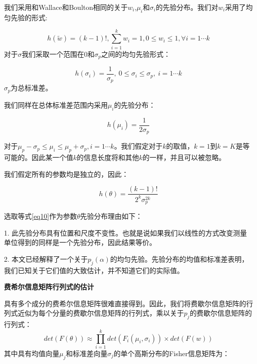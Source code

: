 \documentclass[a4paper,12pt,openany,oneside,utf-8]{ctexbook}
\begin{document}
	我们采用和Wallace和Boulton\cite{ref29}相同的关于$w_i$,$\mu_i$和$\sigma_i$的先验分布。我们对$w_i$采用了均匀先验的形式:
	
    \begin{equation}
        h(\tilde{w})=(k-1)!,\sum_{i=1}^k w_i=1,0\leq w_i\leq 1,\forall i=1\cdots k
    \end{equation}
	对于$\sigma$我们采取一个范围在0和$\sigma_p$之间的均匀先验形式：
	
	\begin{equation}
	    h(\sigma_i)=\frac{1}{\sigma_p},\    0\leq \sigma_i\leq \sigma_p, \   i=1\cdots k
	\end{equation}
	$\sigma_p$为总标准差。
	
	我们同样在总体标准差范围内采用$\mu_i$的先验分布：
	
	\begin{equation}
	    h(\mu_i)=\frac{1}{2\sigma_p}
	\end{equation}
	
	对于$\mu_p-\sigma_p\leq \mu_i \leq \mu_p+\sigma_p,i=1\cdots k$。我们假定对于$k$的取值，$k=1$到$k=K$是等可能的。因此某一个值$k$的信息长度将和其他$k$的一样，并且可以被忽略。
	
	我们假定所有的参数均是独立的，因此：
	
	\begin{equation}\label{eq10}
	    h(\theta) = \frac{(k-1)!}{2^k\sigma_p^{2k}}
	\end{equation}
	
	选取等式\ref{eq10}作为参数$\theta$先验分布理由如下：
	
	1.	此先验分布具有位置和尺度不变性。也就是说如果我们以线性的方式改变测量单位得到的同样是一个先验分布，因此结果等价。
	
    2.	本文已经解释了一个关于$p_j(\alpha)$的均匀先验。先验分布的均值和标准差表明，我们已知关于它们值的大致估计，并不知道它们的实际值。
    
    \textbf{费希尔信息矩阵行列式的估计}
    
    具有多个成分的费希尔信息矩阵很难直接得到。因此，我们将费歇尔信息矩阵的行列式近似为每个分量的费歇尔信息矩阵的行列式，乘以关于$p_j$的费歇尔信息矩阵的行列式：
    \begin{equation}\label{eq11}
        de t (F(\theta))\approx \prod_{i=1}^{k}det (F_i(\mu_i,\sigma_i))\times det (F(w))
    \end{equation}
    其中具有均值向量$\mu_j$和标准差向量$\sigma_j$的单个高斯分布的Fisher信息矩阵为：
    
\end{document}
